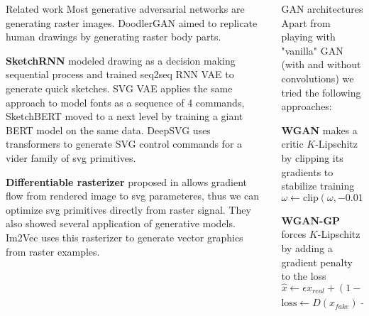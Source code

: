 \documentclass{beamer}
\newcommand{\paragraph}[1]{\noindent\textbf{#1}\quad}
\begin{document}
\begin{frame}[fragile]
\begin{columns}[T]
\begin{column}{.33\textwidth}
\begin{block}{Related work}
	Most generative adversarial networks are generating raster images. DoodlerGAN \cite{doodlergan} aimed to replicate human drawings by generating raster body parts.
	
	\paragraph{SketchRNN} \cite{sketchrnn} modeled drawing as a decision making sequential process and trained seq2seq RNN VAE to generate quick sketches. SVG VAE \cite{svgvae} applies the same approach to model fonts as a sequence of 4 commands, SketchBERT \cite{sketchbert} moved to a next level by training a giant BERT model on the same data. DeepSVG \cite{carlier2020deepsvg} uses transformers to generate SVG control commands for a vider family of svg primitives.

	
	\paragraph{Differentiable rasterizer} proposed in \cite{diffsvg} allows gradient flow from rendered image to svg parameteres, thus we can optimize svg primitives directly from raster signal. They also showed several application of generative models. Im2Vec \cite{reddy2021im2vec} uses this rasterizer to generate vector graphics from raster examples.
	
\end{block}

\end{column}

\begin{column}{.3\textwidth}



\begin{block}{GAN architectures}
	Apart from playing with "vanilla" GAN (with and without convolutions) we tried the following approaches:
	
\paragraph{WGAN} \cite{arjovsky2017wasserstein} makes a critic $K$-Lipschitz by clipping its gradients to stabilize training 
$$\omega \leftarrow \text{clip} (\omega, -0.01, 0.01)$$

\paragraph {WGAN-GP} \cite{gulrajani2017improved} forces $K$-Lipschitz by adding a gradient penalty to the loss
$$\hat x \leftarrow \epsilon x_{real} + (1-\epsilon) x_{fake}$$ 
$$\text{loss} \leftarrow D(x_{fake}) - D(x_{real}) + \lambda (\| \nabla_{\hat x} D(\hat x) \|_2 - 1)^2$$
 

\end{block}
\end{column}
\end{columns}
\end{frame}
\end{document}
